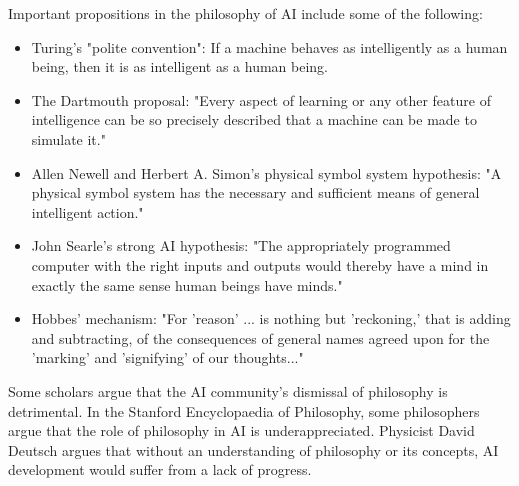 \documentclass[12pt]{article}
\begin{document}
Important propositions in the philosophy of AI include some of the following:

\begin{itemize}
	\item Turing's "polite convention": If a machine behaves as intelligently as a human being, then it is as intelligent as a human being.

	\item The Dartmouth proposal: "Every aspect of learning or any other feature of intelligence can be so precisely described that a machine can be made to simulate it."

	\item Allen Newell and Herbert A. Simon's physical symbol system hypothesis: "A physical symbol system has the necessary and sufficient means of general intelligent action."

	\item John Searle's strong AI hypothesis: "The appropriately programmed computer with the right inputs and outputs would thereby have a mind in exactly the same sense human beings have minds."

	\item Hobbes' mechanism: "For 'reason' ... is nothing but 'reckoning,' that is adding and subtracting, of the consequences of general names agreed upon for the 'marking' and 'signifying' of our thoughts..."

\end{itemize}
Some scholars argue that the AI community's dismissal of philosophy is detrimental. In the Stanford Encyclopaedia of Philosophy, some philosophers argue that the role of philosophy in AI is underappreciated. Physicist David Deutsch argues that without an understanding of philosophy or its concepts, AI development would suffer from a lack of progress.
\end{document}
